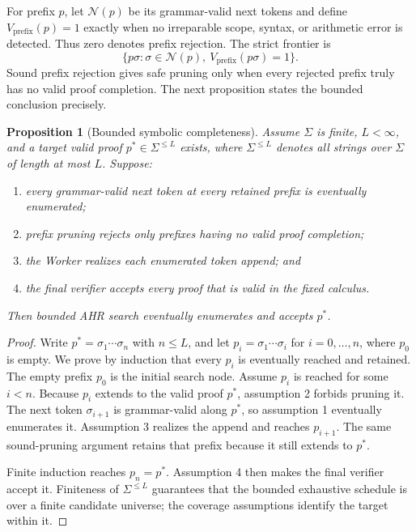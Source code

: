 \documentclass[11pt,oneside]{book}
\newtheorem{proposition}[definition]{Proposition}
\theoremstyle{remark}
\begin{document}
For prefix $p$, let $\mathcal N(p)$ be its grammar-valid next tokens and
define $V_{\mathrm{prefix}}(p)=1$ exactly when no irreparable scope, syntax,
or arithmetic error is detected. Thus zero denotes prefix rejection. The
strict frontier is
\[
\{p\sigma:\sigma\in\mathcal N(p),\ V_{\mathrm{prefix}}(p\sigma)=1\}.
\]
Sound prefix rejection gives safe pruning only when every rejected prefix truly has no valid proof completion. The next proposition states the bounded conclusion precisely.

\begin{proposition}[Bounded symbolic completeness]
Assume $\Sigma$ is finite, $L<\infty$, and a target valid proof
$p^*\in\Sigma^{\le L}$ exists, where $\Sigma^{\le L}$ denotes all strings
over $\Sigma$ of length at most $L$. Suppose:
\begin{enumerate}
  \item every grammar-valid next token at every retained prefix is eventually enumerated;
  \item prefix pruning rejects only prefixes having no valid proof completion;
  \item the Worker realizes each enumerated token append; and
  \item the final verifier accepts every proof that is valid in the fixed calculus.
\end{enumerate}
Then bounded AHR search eventually enumerates and accepts $p^*$.
\end{proposition}

\begin{proof}
Write $p^*=\sigma_1\cdots\sigma_n$ with $n\le L$, and let
$p_i=\sigma_1\cdots\sigma_i$ for $i=0,\ldots,n$, where $p_0$ is empty.
We prove by induction that every $p_i$ is eventually reached and retained.
The empty prefix $p_0$ is the initial search node. Assume $p_i$ is reached
for some $i<n$. Because $p_i$ extends to the valid proof $p^*$, assumption 2
forbids pruning it. The next token $\sigma_{i+1}$ is grammar-valid along
$p^*$, so assumption 1 eventually enumerates it. Assumption 3 realizes the
append and reaches $p_{i+1}$. The same sound-pruning argument retains that
prefix because it still extends to $p^*$.

Finite induction reaches $p_n=p^*$. Assumption 4 then makes the final
verifier accept it. Finiteness of $\Sigma^{\le L}$ guarantees that the
bounded exhaustive schedule is over a finite candidate universe; the
coverage assumptions identify the target within it.
\end{proof}
\end{document}
